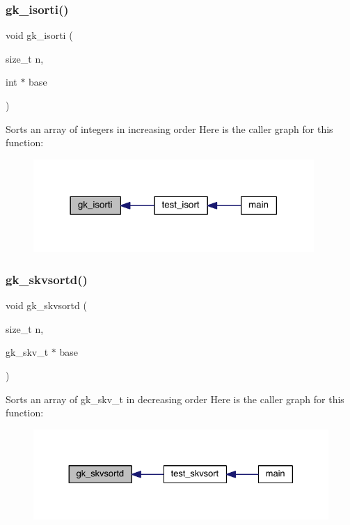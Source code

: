 \subsubsection{\texorpdfstring{gk\+\_\+isorti()}{gk\_isorti()}}
{\footnotesize\ttfamily void gk\+\_\+isorti (\begin{DoxyParamCaption}\item[{size\+\_\+t}]{n,  }\item[{int $\ast$}]{base }\end{DoxyParamCaption})}

Sorts an array of integers in increasing order Here is the caller graph for this function\+:\nopagebreak
\begin{figure}[H]
\begin{center}
\leavevmode
\includegraphics[width=302pt]{a00140_ad434d886936ca951a6694a1d2037bbe3_icgraph}
\end{center}
\end{figure}
\mbox{\label{a00140_aa36cc3e92563f4f97c8e21f45728bf72}} 
\subsubsection{\texorpdfstring{gk\+\_\+skvsortd()}{gk\_skvsortd()}}
{\footnotesize\ttfamily void gk\+\_\+skvsortd (\begin{DoxyParamCaption}\item[{size\+\_\+t}]{n,  }\item[{gk\+\_\+skv\+\_\+t $\ast$}]{base }\end{DoxyParamCaption})}

Sorts an array of gk\+\_\+skv\+\_\+t in decreasing order Here is the caller graph for this function\+:\nopagebreak
\begin{figure}[H]
\begin{center}
\leavevmode
\includegraphics[width=330pt]{a00140_aa36cc3e92563f4f97c8e21f45728bf72_icgraph}
\end{center}
\end{figure}
\mbox{\label{a00140_ab75cbfb8dbe418fab354f124992d7c70}} 
